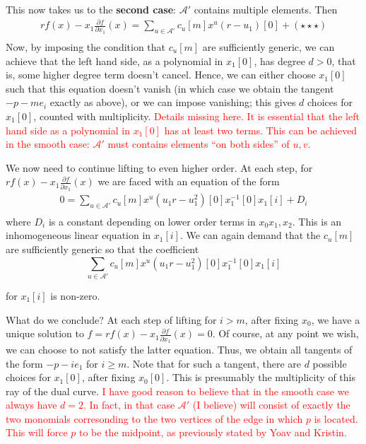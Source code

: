 \documentclass[oneside]{amsart}
\newcommand{\A}{\mathcal{A}}
\newcommand{\HOT}{(\star\star\star)}
\theoremstyle{definition}
\newcommand{\nathan}[1]{\textcolor{red}{#1}}
\begin{document}
This now takes us to the {\bf second case}: $\A'$ contains multiple elements.
Then 
\begin{align*}rf(x)-x_1\frac{\partial f}{\partial x_1}(x)=
	\sum_{u\in \A'}c_u[m]x^u(r-u_1)[0]+\HOT\\
\end{align*}
Now, by imposing the condition that $c_u[m]$ are sufficiently generic, we can achieve that the left hand side, as a polynomial in $x_1[0]$, has degree $d>0$, that is, some higher degree term doesn't cancel. Hence, we can either choose $x_1[0]$ such that this equation doesn't vanish (in which case we obtain the tangent $-p-me_i$ exactly as above), or we can impose vanishing; this gives $d$ choices for $x_1[0]$, counted with multiplicity.
\nathan{Details missing here. It is essential that the left hand side as a polynomial in $x_1[0]$ has at least two terms. This can be achieved in the smooth case: $\A'$ must contains elements ``on both sides'' of $u,v$.}


We now need to continue lifting to even higher order. At each step,  for $rf(x)-x_1\frac{\partial f}{\partial x_1}(x)$ we are faced with an equation of the form
\begin{align*}
	0=	\sum_{u\in \A'}c_u[m]x^u(u_1r-u_1^{2})[0]x_1^{-1}[0]x_1[i]+D_i\\
\end{align*}
where $D_i$ is a constant depending on lower order terms in $x_0x_1,x_2$. This is an inhomogeneous linear equation in $x_1[i]$. We can again demand that the $c_u[m]$ are sufficiently generic so that the coefficient 
\[
	\sum_{u\in \A'}c_u[m]x^u(u_1r-u_1^{2})[0]x_1^{-1}[0]x_1[i]
\]

for $x_1[i]$ is non-zero. 

What do we conclude? At each step of lifting for $i>m$, after fixing $x_0$, we have a unique solution  to $f=rf(x)-x_1\frac{\partial f}{\partial x_1}(x)=0$. Of course, at any point we wish, we can choose to not satisfy the latter equation. Thus, we obtain all tangents of the form $-p-ie_1$ for $i\geq m$. Note that for such a tangent, there are $d$ possible choices for $x_1[0]$, after fixing $x_0[0]$. This is presumably the multiplicity of this ray of the dual curve. \nathan{I have good reason to believe that in the smooth case we always have $d=2$. In fact, in that case $\A'$ (I believe) will consist of exactly the two monomials corresonding to the two vertices of the edge in which $p$ is located. This will force $p$ to be the midpoint, as previously stated by Yoav and Kristin.}
\end{document}
